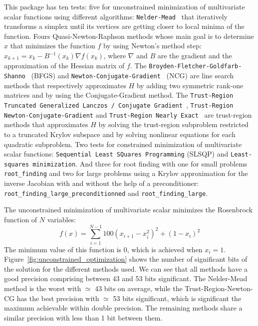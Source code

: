 \documentclass[11pt]{article}
\begin{document}
This package has ten tests: five for unconstrained minimization of multivariate scalar functions using different algorithms: \texttt{Nelder-Mead}~\cite{singer2009nelder} that iteratively transforms a simplex until its vertices are getting closer to local minima of the function. Fours Quasi-Newton-Raphson methods whose main goal is to determine $x$ that minimizes the function $f$ by using Newton's method step: $x_{k+1} = x_{k} - B^{-1}(x_k)\nabla f(x_k)$, where $\nabla$ and $B$ are the gradient and the approximation of the Hessian matrix of $f$. The \texttt{Broyden-Fletcher-Goldfarb-Shanno}~\cite{BFGS} (BFGS) and \texttt{Newton-Conjugate-Gradient}~\cite{nocedal2006numerical} (NCG) are line search methods that respectively approximates $H$ by adding two symmetric rank-one matrices and by using the Conjugate-Gradient method. The \texttt{Trust-Region Truncated Generalized Lanczos / Conjugate Gradient}~\cite{gould1999solving}, \texttt{Trust-Region Newton-Conjugate-Gradient} and \texttt{Trust-Region Nearly Exact}~\cite{nocedal2006numerical} are trust-region methods that approximates $H$ by solving the trust-region subproblem restricted to a truncated Krylov subspace and by solving nonlinear equations for each quadratic subproblem. Two tests for constrained minimization of multivariate scalar functions: \texttt{Sequential Least SQuares Programming} (SLSQP) and \texttt{Least-squares minimization}.
And three for root finding with one for small problems \texttt{root\_finding} and two for large problems using a Krylov approximation for the inverse Jacobian with and without the help of a preconditioner: \texttt{root\_finding\_large\_preconditionned} and \texttt{root\_finding\_large}.

The unconstrained minimization of multivariate scalar minimizes the Rosenbrock function of $N$ variables:
\[f(x) = \sum_{i=1}^{N-1} 100(x_{i+1}-x^2_i)^2 + (1-x_i)^2\]
The minimum value of this function is 0, which is achieved when $x_i=1$.
Figure~\ref{fig:unconstrained_optimization} shows the number of significant bits of the solution for the different methods used. We can see that all methods have a good precision comprising between 43 and 53 bits significant. The Nelder-Mead method is the worst with $\simeq$ 43 bits on average, while the Trust-Region-Newton-CG has the best precision with $\simeq$ 53 bits significant, which is significant the maximum achievable within double precision. The remaining methods share a similar precision with less than 1 bit between them.
\end{document}
